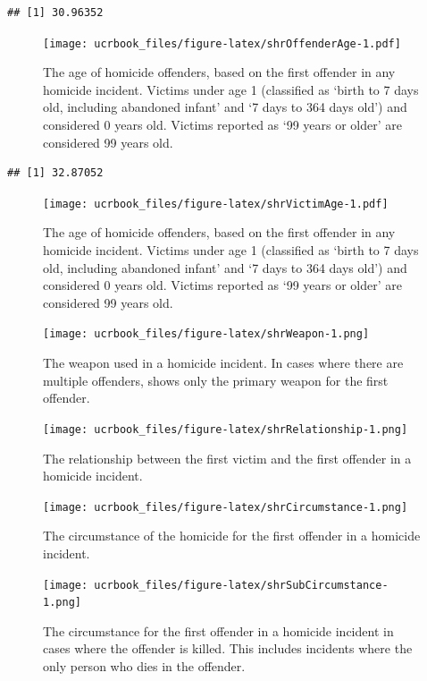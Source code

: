 \documentclass[
  12pt,
  openany]{book}
\begin{document}
\begin{verbatim}
## [1] 30.96352
\end{verbatim}

\begin{figure}
\centering
\texttt{[image: ucrbook\_files/figure-latex/shrOffenderAge-1.pdf]}
\caption{\label{fig:shrOffenderAge}The age of homicide offenders, based on the first offender in any homicide incident. Victims under age 1 (classified as `birth to 7 days old, including abandoned infant' and `7 days to 364 days old') and considered 0 years old. Victims reported as `99 years or older' are considered 99 years old.}
\end{figure}

\begin{verbatim}
## [1] 32.87052
\end{verbatim}

\begin{figure}
\centering
\texttt{[image: ucrbook\_files/figure-latex/shrVictimAge-1.pdf]}
\caption{\label{fig:shrVictimAge}The age of homicide offenders, based on the first offender in any homicide incident. Victims under age 1 (classified as `birth to 7 days old, including abandoned infant' and `7 days to 364 days old') and considered 0 years old. Victims reported as `99 years or older' are considered 99 years old.}
\end{figure}

\begin{figure}
\centering
\texttt{[image: ucrbook\_files/figure-latex/shrWeapon-1.png]}
\caption{\label{fig:shrWeapon}The weapon used in a homicide incident. In cases where there are multiple offenders, shows only the primary weapon for the first offender.}
\end{figure}

\begin{figure}
\centering
\texttt{[image: ucrbook\_files/figure-latex/shrRelationship-1.png]}
\caption{\label{fig:shrRelationship}The relationship between the first victim and the first offender in a homicide incident.}
\end{figure}

\begin{figure}
\centering
\texttt{[image: ucrbook\_files/figure-latex/shrCircumstance-1.png]}
\caption{\label{fig:shrCircumstance}The circumstance of the homicide for the first offender in a homicide incident.}
\end{figure}

\begin{figure}
\centering
\texttt{[image: ucrbook\_files/figure-latex/shrSubCircumstance-1.png]}
\caption{\label{fig:shrSubCircumstance}The circumstance for the first offender in a homicide incident in cases where the offender is killed. This includes incidents where the only person who dies in the offender.}
\end{figure}
\end{document}
